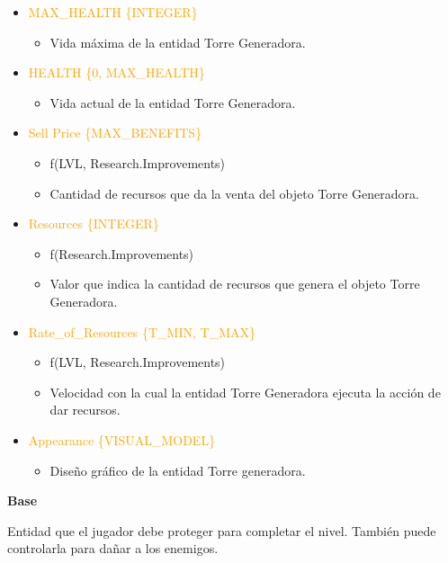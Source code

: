 \documentclass{article}
\begin{document}
\begin{itemize}
    \item \textcolor{Orange}{MAX\_HEALTH \{INTEGER\}}
    \begin{itemize}
        \item Vida máxima de la entidad Torre Generadora.
    \end{itemize}
    \item \textcolor{Orange}{HEALTH \{0, MAX\_HEALTH\}}
    \begin{itemize}
        \item Vida actual de la entidad Torre Generadora.
    \end{itemize}
    \item \textcolor{Orange}{Sell Price \{MAX\_BENEFITS\}}
    \begin{itemize}
        \item f(LVL, Research.Improvements)
        \item Cantidad de recursos que da la venta del objeto Torre Generadora.
    \end{itemize}
    \clearpage
    \item \textcolor{Orange}{Resources \{INTEGER\}}
    \begin{itemize}
        \item f(Research.Improvements)
        \item Valor que indica la cantidad de recursos que genera el objeto Torre Generadora.
    \end{itemize}
    \item \textcolor{Orange}{Rate\_of\_Resources \{T\_MIN, T\_MAX\}}
    \begin{itemize}
        \item f(LVL, Research.Improvements) 
        \item Velocidad con la cual la entidad Torre Generadora ejecuta la acción de dar recursos. 
    \end{itemize}
    \item \textcolor{Orange}{Appearance \{VISUAL\_MODEL\}}
    \begin{itemize}
        \item Diseño gráfico de la entidad Torre generadora.
    \end{itemize}
\end{itemize}

\noindent \textbf{Base}

\hfill \break \noindent Entidad que el jugador debe proteger para completar el nivel. También puede controlarla para dañar a los enemigos.
\end{document}
